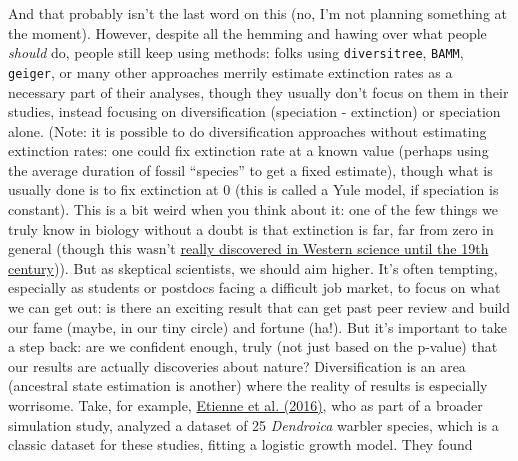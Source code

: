 \documentclass[]{article}
\theoremstyle{definition}
\theoremstyle{definition}
\theoremstyle{definition}
\theoremstyle{remark}
\begin{document}
And that probably isn't the last word on this (no, I'm not planning
something at the moment). However, despite all the hemming and hawing
over what people \emph{should} do, people still keep using methods:
folks using \texttt{diversitree}, \texttt{BAMM}, \texttt{geiger}, or
many other approaches merrily estimate extinction rates as a necessary
part of their analyses, though they usually don't focus on them in their
studies, instead focusing on diversification (speciation - extinction)
or speciation alone. (Note: it is possible to do diversification
approaches without estimating extinction rates: one could fix extinction
rate at a known value (perhaps using the average duration of fossil
``species'' to get a fixed estimate), though what is usually done is to
fix extinction at 0 (this is called a Yule model, if speciation is
constant). This is a bit weird when you think about it: one of the few
things we truly know in biology without a doubt is that extinction is
far, far from zero in general (though this wasn't
\href{http://www.ucmp.berkeley.edu/mammal/artio/irishelk.html}{really
discovered in Western science until the 19th century})). But as
skeptical scientists, we should aim higher. It's often tempting,
especially as students or postdocs facing a difficult job market, to
focus on what we can get out: is there an exciting result that can get
past peer review and build our fame (maybe, in our tiny circle) and
fortune (ha!). But it's important to take a step back: are we confident
enough, truly (not just based on the p-value) that our results are
actually discoveries about nature? Diversification is an area (ancestral
state estimation is another) where the reality of results is especially
worrisome. Take, for example,
\href{http://onlinelibrary.wiley.com/doi/10.1111/2041-210X.12565/abstract}{Etienne
et al. (2016)}, who as part of a broader simulation study, analyzed a
dataset of 25 \emph{Dendroica} warbler species, which is a classic
dataset for these studies, fitting a logistic growth model. They found
\end{document}
